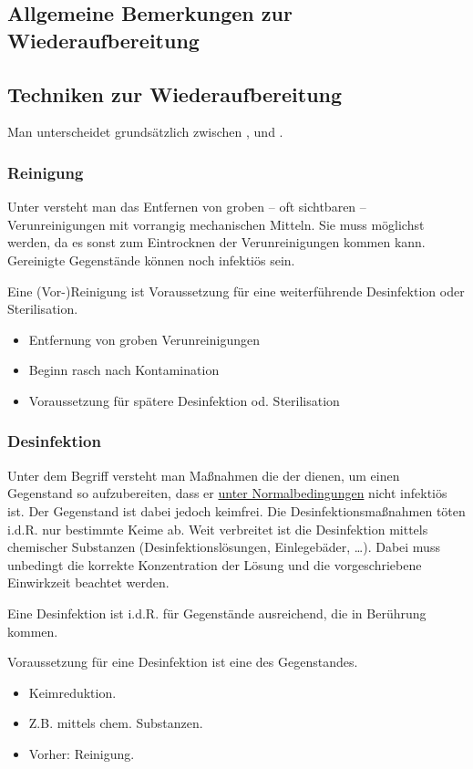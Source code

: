 \subsection{Allgemeine Bemerkungen zur Wiederaufbereitung}




\subsection{Techniken zur Wiederaufbereitung}

Man unterscheidet grundsätzlich zwischen ,  und 
.

\subsubsection{Reinigung}

{
Unter  versteht man das Entfernen von groben -- oft sichtbaren --
Verunreinigungen mit vorrangig mechanischen Mitteln. Sie muss
möglichst  werden, da es sonst zum
Eintrocknen der Verunreinigungen kommen kann. Gereinigte Gegenstände können
noch infektiös sein.

Eine (Vor-)Reinigung ist Voraussetzung für eine weiterführende Desinfektion
oder Sterilisation. 
}{
\begin{itemize}
  \item Entfernung von groben Verunreinigungen
  \item Beginn rasch nach Kontamination
  \item Voraussetzung für spätere Desinfektion od. Sterilisation
\end{itemize}
}{}{}{}



\subsubsection{Desinfektion}

{
Unter dem Begriff  versteht man Maßnahmen die der
 dienen, um einen Gegenstand so aufzubereiten, dass er
\underline{unter Normalbedingungen} nicht infektiös ist. Der Gegenstand ist
dabei jedoch  keimfrei. Die Desinfektionsmaßnahmen töten i.d.R. nur
bestimmte Keime ab. Weit verbreitet ist die Desinfektion mittels chemischer
Substanzen (Desinfektionslösungen, Einlegebäder, \ldots). Dabei muss unbedingt
die korrekte Konzentration der Lösung und die vorgeschriebene Einwirkzeit
beachtet werden.

Eine Desinfektion ist i.d.R. für Gegenstände ausreichend, die  in Berührung kommen.

Voraussetzung für eine Desinfektion ist eine  des
Gegenstandes.

 }{
\begin{itemize}
  \item Keimreduktion.
  \item Z.B. mittels chem. Substanzen.
  \item Vorher: Reinigung.
\end{itemize}
}{}{}{}

